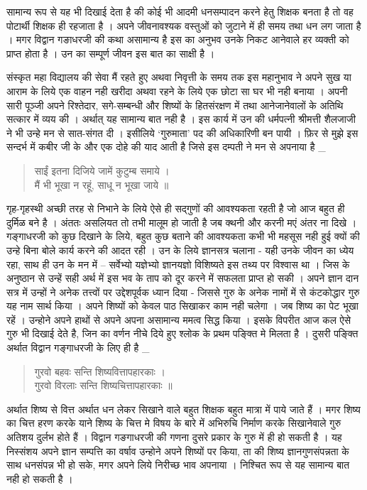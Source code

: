सामान्य रूप से यह भी दिखाई देता है की कोई भी आदमी धनसम्पादन करने हेतु शिक्षक बनता है तो वह पोटार्थी शिक्षक ही रहजाता है । अपने जीवनावश्यक वस्तुओं को जुटाने में ही समय तथा धन लग जाता है । मगर विद्वान गङाधरजी की कथा असामान्य है इस का अनुभव उनके निकट आनेवाले हर व्यक्ती को प्राप्त होता है । उन का सम्पूर्ण जीवन इस बात का साक्षी है ।

संस्कृत महा विद्यालय की सेवा मैं रहते हुए अथवा निवृत्ती के समय तक इस महानुभाव ने अपने सुख या आराम के लिये एक वाहन नही खरीदा अथवा रहने के लिये एक छोटा सा घर भी नही बनाया । अपनी सारी पूञ्जी अपने रिश्तेदार, सगे-सम्बन्धी और शिष्यों के हितसंरक्षण में तथा आनेजानेवालों के अतिथि सत्कार में व्यय की । अर्थात् यह सामान्य बात नही है । इस कार्य में उन की धर्मपत्नी श्रीमत्ती शैलजाजी ने भी उन्हे मन से सात-संगत दी । इसीलिये ‘गुरुमाता’ पद की अधिकारिणी बन पायी । फ़िर से मुझे इस सन्दर्भ में कबीर जी के और एक दोहे की याद आती है जिसे इस दम्पती ने मन से अपनाया है _
\begin{verse}
साईं इतना दिजिये जामें कुटुम्ब समाये ।\\
मैं भी भूखा न रहूं, साधू न भूखा जाये ॥
\end{verse}
गृह-गृहस्थी अच्छी तरह से निभाने के लिये ऐसे ही सद्गुणों की आवश्यकता रहती है जो आज बहुत ही दुर्मिळ बने है । अंततः असलियत तो तभी मालूम हो जाती है जब क्थनी और करनी मएं अंतर ना दिखे । गङ्गाधरजी को कुछ दिखाने के लिये, बहुत कुछ बताने की आवश्यकता कभी भी महसूस नही हुई क्यों की उन्हे बिना बोले कार्य करने की आदत रही । उन के लिये ज्ञानसत्र चलाना - यही उनके जीवन का ध्येय रहा, साथ ही उन के मन में -- सर्वेभ्यो यज्ञेभ्यो ज्ञानयज्ञो विशिष्यते इस तथ्य पर विश्वास था । जिस के अनुष्ठान से उन्हें सही अर्थ में इस भव के ताप को दूर करने में सफलता प्राप्त हो सकी । अपने ज्ञान दान सत्र में उन्हों ने अनेक तत्त्वों पर उद्देशपूर्वक ध्यान दिया - जिससे गुरु के अनेक नामों में से कंटकोद्धार गुरु यह नाम सार्थ किया । अपने शिष्यों को केवल पाठ सिखाकर काम नही चलेगा । जब शिष्य का पेट भूखा रहें । उन्होने अपने हाथों से अपने अपना असामान्य ममत्व सिद्ध किया । इसके विपरीत आज कल ऐसे गुरु भी दिखाई देते है, जिन का वर्णन नीचे दिये हुए श्लोक के प्रथम पङ्क्ति मे मिलता है । दुसरी पङ्क्ति अर्थात विद्वान गङ्गाधरजी के लिए ही है _ 
\begin{verse}
गुरवो बहवः सन्ति शिष्यवित्तापहारकाः ।\\
गुरवो विरलाः सन्ति शिष्यचित्तापहारकाः ॥
\end{verse}
अर्थात शिष्य से वित्त अर्थात धन लेकर सिखाने वाले बहुत शिक्षक बहुत मात्रा में पाये जाते हैं । मगर शिष्य का चित्त हरण  करके याने शिष्य के चित्त मे विषय के बारे में अभिरुचि निर्माण करके सिखानेवाले गुरु अतिशय दुर्लभ  होते हैं । विद्वान गङगाधरजी की गणना दुसरे प्रकार के गुरु में ही हो सकती है । यह निस्संशय अपने ज्ञान सम्पत्ति का वर्षाव उन्होने अपने शिष्यों पर किया, ता की शिष्य ज्ञानगुणसंपन्नता के साथ धनसंपन्न भी हो सके, मगर अपने लिये निरीच्छ भाव अपनाया । निश्चित रूप से यह सामान्य बात नही हो सकती है ।


